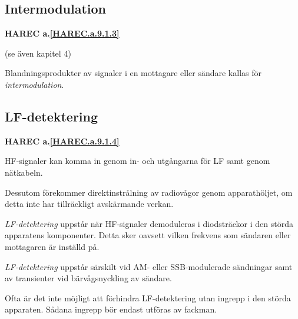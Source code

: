 \subsection{Intermodulation}
\textbf{
HAREC a.\ref{HAREC.a.9.1.3}\label{myHAREC.a.9.1.3}
}

(se även kapitel 4)

Blandningsprodukter av signaler i en mottagare eller sändare kallas
för \emph{intermodulation}.

\subsection{LF-detektering}
\textbf{
HAREC a.\ref{HAREC.a.9.1.4}\label{myHAREC.a.9.1.4}
}

HF-signaler kan komma in genom in- och utgångarna för LF samt genom nätkabeln.

Dessutom förekommer direktinstrålning av radiovågor genom apparathöljet, om
detta inte har tillräckligt avskärmande verkan.

\emph{LF-detektering} uppstår när HF-signaler demoduleras i diodsträckor i den
störda apparatens komponenter. Detta sker oavsett vilken frekvens som sändaren
eller mottagaren är inställd på.

\emph{LF-detektering} uppstår särskilt vid AM- eller SSB-modulerade sändningar
samt av transienter vid bärvågsnyckling av sändare.

Ofta är det inte möjligt att förhindra LF-detektering utan ingrepp i den störda
apparaten. Sådana ingrepp bör endast utföras av fackman.

